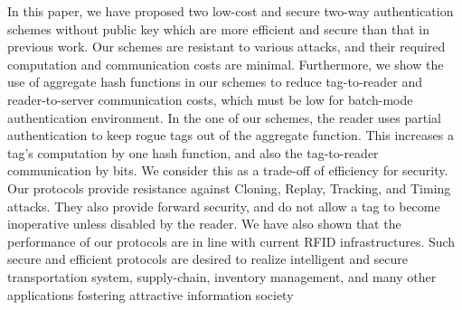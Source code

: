 \documentclass{easychair}
\begin{document}
In this paper, we have proposed two low-cost and secure two-way authentication 
schemes without public key which are more efficient and secure than that in previous work. Our 
schemes are resistant to various attacks, and their required computation and 
communication costs are minimal. Furthermore, we show the use of aggregate hash 
functions in our schemes to reduce tag-to-reader and reader-to-server communication costs, which must be 
low for batch-mode 
authentication environment. In the one of our schemes, the reader 
uses partial authentication to keep rogue tags out of the aggregate 
function. This increases a tag's computation by one hash function, and also the 
tag-to-reader communication by  bits. We consider this as a trade-off of efficiency for
security. Our protocols provide 
resistance against Cloning, Replay, 
Tracking, and Timing attacks. They also provide forward security, and do not allow a 
tag to become inoperative unless disabled by the reader. We have also shown that the performance of our protocols are in line with current RFID infrastructures. Such secure and efficient protocols are desired to realize 
intelligent and secure transportation system, supply-chain, inventory management, and many other applications fostering 
attractive information society



\label{sect:bib}


\end{document}
